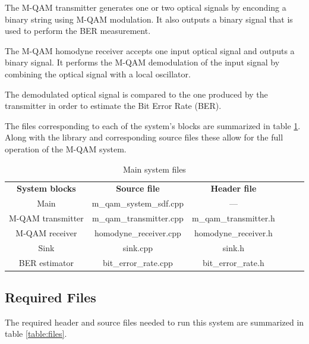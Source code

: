 The M-QAM transmitter generates one or two optical signals by enconding a binary string using M-QAM modulation. It also outputs a binary signal that is used to perform the BER measurement.

The M-QAM homodyne receiver accepts one input optical signal and outputs
a binary signal. It performs the M-QAM demodulation of the input signal by combining the optical signal with a local oscillator.

The demodulated optical signal is compared to the one produced by the transmitter in order to estimate the Bit Error Rate (BER).

The files corresponding to each of the system's blocks are summarized in table \ref{files_table}. Along with the library and corresponding source files these allow for the full operation of the M-QAM system.

\begin{table}[]
	\centering
	\caption{Main system files}
	\begin{tabular}{|c|c|c|ccc}
		\cline{1-3}
		\textbf{System blocks} & \textbf{Source file} & \textbf{Header file}  &  \\ \cline{1-3}
		Main & m\_qam\_system\_sdf.cpp & --- &  \\ \cline{1-3}
		M-QAM transmitter & m\_qam\_transmitter.cpp & m\_qam\_transmitter.h &  \\ \cline{1-3}
		M-QAM receiver & homodyne\_receiver.cpp & homodyne\_receiver.h &   \\ \cline{1-3}
		Sink & sink.cpp & sink.h &   \\ \cline{1-3}
		BER estimator & bit\_error\_rate.cpp & bit\_error\_rate.h &  \\ \cline{1-3}
	\end{tabular}
	\label{files_table}
\end{table}

\subsection*{Required Files}

The required header and source files needed to run this system are summarized in table \ref{table:files}.

